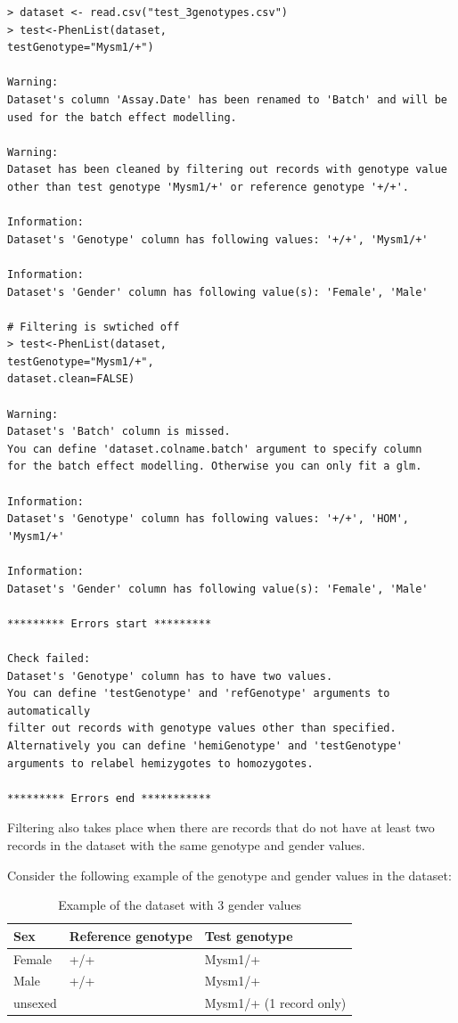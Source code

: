 \documentclass[12pt,a4paper]{article}
\begin{document}
\begingroup
    \fontsize{8pt}{12pt}\selectfont
\begin{verbatim}
> dataset <- read.csv("test_3genotypes.csv")
> test<-PhenList(dataset,
testGenotype="Mysm1/+")

Warning:
Dataset's column 'Assay.Date' has been renamed to 'Batch' and will be used for the batch effect modelling.

Warning:
Dataset has been cleaned by filtering out records with genotype value 
other than test genotype 'Mysm1/+' or reference genotype '+/+'.

Information:
Dataset's 'Genotype' column has following values: '+/+', 'Mysm1/+'

Information:
Dataset's 'Gender' column has following value(s): 'Female', 'Male'

# Filtering is swtiched off
> test<-PhenList(dataset,
testGenotype="Mysm1/+",
dataset.clean=FALSE)

Warning:
Dataset's 'Batch' column is missed.
You can define 'dataset.colname.batch' argument to specify column 
for the batch effect modelling. Otherwise you can only fit a glm.

Information:
Dataset's 'Genotype' column has following values: '+/+', 'HOM', 'Mysm1/+'

Information:
Dataset's 'Gender' column has following value(s): 'Female', 'Male'

********* Errors start *********

Check failed:
Dataset's 'Genotype' column has to have two values.
You can define 'testGenotype' and 'refGenotype' arguments to automatically 
filter out records with genotype values other than specified. 
Alternatively you can define 'hemiGenotype' and 'testGenotype' arguments to relabel hemizygotes to homozygotes.

********* Errors end ***********
\end{verbatim}
\endgroup

Filtering also takes place when there are records that do not have at least two records in the dataset with the same genotype and gender values. 

Consider the following example of the genotype and gender values in the dataset:
\begin{table}[!h]
\caption{Example of the dataset with 3 gender values}\label{table:02}
\begin{center}
\begin{tabular}{| l | l | l | }
  \hline
Sex&Reference genotype&Test genotype\\\hline
Female&+\slash +&Mysm1\slash +\\
Male&+\slash +&Mysm1\slash +\\
unsexed& &Mysm1\slash + (1 record only)\\
\hline  
\end{tabular}
\end{center}
\end{table}
\end{document}
